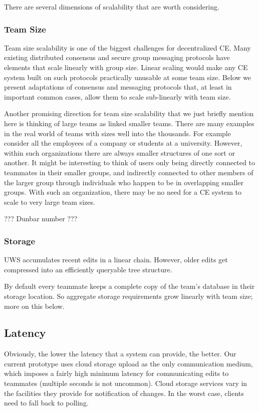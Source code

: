 \documentclass{article}
\begin{document}
There are several dimensions of scalability that are worth considering.

\subsubsection{Team Size}

Team size scalability is one of the biggest challenges for decentralized CE.
Many existing distributed consensus and secure group messaging protocols have elements that scale linearly with group size.
Linear scaling would make any CE system built on such protocols practically unusable at some team size.
Below we present adaptations of consensus and messaging protocols that, at least in important common cases, allow them to scale sub-linearly with team size.

Another promising direction for team size scalability that we just briefly mention here is thinking of large teams as linked smaller teams.
There are many examples in the real world of teams with sizes well into the thousands.
For example consider all the employees of a company or students at a university.
However, within such organizations there are always smaller structures of one sort or another.
It might be interesting to think of users only being directly connected to teammates in their smaller groups, and indirectly connected to other members of the larger group through individuals who happen to be in overlapping smaller groups.
With such an organization, there may be no need for a CE system to scale to very large team sizes.

??? Dunbar number ???

\subsubsection{Storage}

UWS accumulates recent edits in a linear chain.
However, older edits get compressed into an efficiently queryable tree structure.

By default every teammate keeps a complete copy of the team's database in their storage location.
So aggregate storage requirements grow linearly with team size; more on this below.

\subsection{Latency}

Obviously, the lower the latency that a system can provide, the better.
Our current prototype uses cloud storage upload as the only communication medium, which imposes a fairly high minimum latency for communicating edits to teammates (multiple seconds is not uncommon).
Cloud storage services vary in the facilities they provide for notification of changes.
In the worst case, clients need to fall back to polling.
\end{document}
